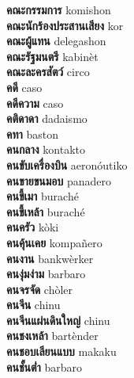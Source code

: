 \textbf{ คณะกรรมการ  } komishon \\
\textbf{ คณะนักร้องประสานเสียง  } kor \\
\textbf{ คณะผู้แทน  } delegashon \\
\textbf{ คณะรัฐมนตรี  } kabinèt \\
\textbf{ คณะละครสัตว์  } circo \\
\textbf{ คดี  } caso \\
\textbf{ คดีความ  } caso \\
\textbf{ คติดาดา  } dadaismo \\
\textbf{ คทา  } baston \\
\textbf{ คนกลาง  } kontakto \\
\textbf{ คนขับเครื่องบิน  } aeronóutiko \\
\textbf{ คนขายขนมอบ  } panadero \\
\textbf{ คนขี้เมา  } buraché \\
\textbf{ คนขี้เหล้า  } buraché \\
\textbf{ คนครัว  } kòki \\
\textbf{ คนคุ้นเคย  } kompañero \\
\textbf{ คนงาน  } bankwèrker \\
\textbf{ คนงุ่มง่าม  } barbaro \\
\textbf{ คนจรจัด  } chòler \\
\textbf{ คนจีน  } chinu \\
\textbf{ คนจีนแผ่นดินใหญ่  } chinu \\
\textbf{ คนชงเหล้า  } bartènder \\
\textbf{ คนชอบเลียนแบบ  } makaku \\
\textbf{ คนชั้นต่ำ  } barbaro \\
